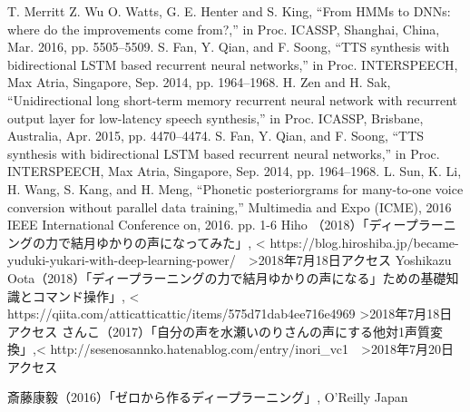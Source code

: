 \begin{thebibliography}{9}
    T. Merritt Z. Wu O. Watts, G. E. Henter and S. King, “From HMMs to DNNs: where do the improvements come from?,” in Proc. ICASSP, Shanghai, China, Mar. 2016, pp. 5505–5509.
   S. Fan, Y. Qian, and F. Soong,
“TTS synthesis with bidirectional LSTM based recurrent neural networks,”
in Proc. INTERSPEECH, Max Atria, Singapore, Sep. 2014, pp. 1964–1968.
   H. Zen and H. Sak, “Unidirectional long short-term memory recurrent neural network with recurrent output layer for low-latency speech synthesis,” in Proc. ICASSP, Brisbane, Australia, Apr. 2015, pp. 4470–4474.
    S. Fan, Y. Qian, and F. Soong, “TTS synthesis with bidirectional LSTM based recurrent neural networks,” in Proc. INTERSPEECH, Max Atria, Singapore, Sep. 2014, pp. 1964–1968.
   L. Sun, K. Li, H. Wang, S. Kang, and H. Meng, “Phonetic posteriorgrams for many-to-one voice conversion without parallel data training,” Multimedia and Expo (ICME), 2016 IEEE International Conference on, 2016. pp. 1-6
   Hiho （2018）「ディープラーニングの力で結月ゆかりの声になってみた」,
 < https://blog.hiroshiba.jp/became-yuduki-yukari-with-deep-learning-power/　>2018年7月18日アクセス
   Yoshikazu Oota（2018）「ディープラーニングの力で結月ゆかりの声になる」ための基礎知識とコマンド操作」, < https://qiita.com/atticatticattic/items/575d71dab4ee716e4969 >2018年7月18日アクセス
   さんこ（2017）「自分の声を水瀬いのりさんの声にする他対1声質変換」,< http://sesenosannko.hatenablog.com/entry/inori\_vc1　>2018年7月20日アクセス
  
   斎藤康毅（2016）「ゼロから作るディープラーニング」, O’Reilly Japan
  
\end{thebibliography}
